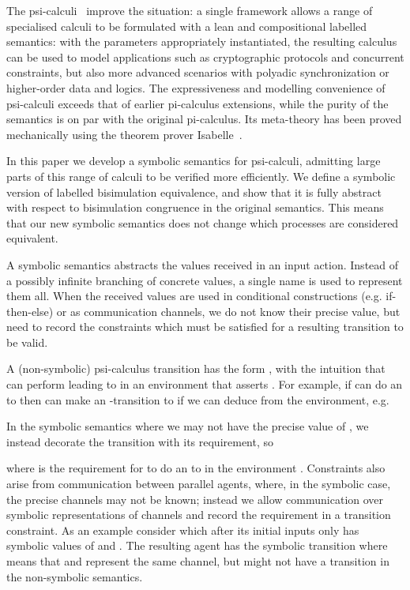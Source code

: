 \documentclass{eptcs}
\theoremstyle{definition}
\begin{document}
The psi-calculi~\cite{bengtson.johansson.ea:psi-calculi} improve the situation: a single framework allows a range of
specialised calculi to be formulated with a lean and compositional labelled
semantics: with the parameters appropriately instantiated, the
resulting calculus can be used to model applications such as
cryptographic protocols and concurrent
constraints, but also more advanced scenarios with polyadic
synchronization or higher-order data and logics.
The expressiveness and modelling convenience of psi-calculi exceeds that
of earlier pi-calculus extensions, while the purity of the semantics
is on par with the original pi-calculus. Its meta-theory has been
proved mechanically using the theorem prover Isabelle~\cite{bengtson.parrow:psi-calculi-isabelle}.

In this paper we develop a symbolic semantics for psi-calculi,
admitting large parts of this range of calculi to be verified more efficiently.
We define a symbolic version of labelled bisimulation equivalence, and
show that it is fully abstract with respect to bisimulation congruence
in the original semantics.  This means that our new symbolic semantics
does not change which processes are considered equivalent.




A symbolic semantics abstracts the values received in an input
action. Instead of a possibly infinite branching of concrete values, a
single name is used to represent them all.  When the received values are
used in conditional constructions (e.g. if-then-else) or as
communication channels, we do not know their precise value, but need to
record the constraints which must be satisfied for a resulting
transition to be valid. 

A (non-symbolic) psi-calculus transition has the form , with
the intuition that  can perform  leading to  in an
environment that asserts .  
For example, if  can
do an  to  then  can make an
-transition
to  if we can deduce  from the environment, 
e.g. 

In the symbolic semantics where we may not have the precise value of
, we instead decorate the transition with its
requirement, so 

where  is the requirement for  to do an  to  in the
environment .
Constraints also arise from communication between parallel agents,
where, in the symbolic case, the precise channels may not be known;
instead we allow communication over symbolic representations of channels and
record the requirement in a transition constraint. As an example
consider 
 which after its initial inputs only has symbolic values of  and
. The resulting agent has the symbolic transition
 where
 means that  and  represent the same channel, but might
not have a  transition in the non-symbolic semantics.
\end{document}
